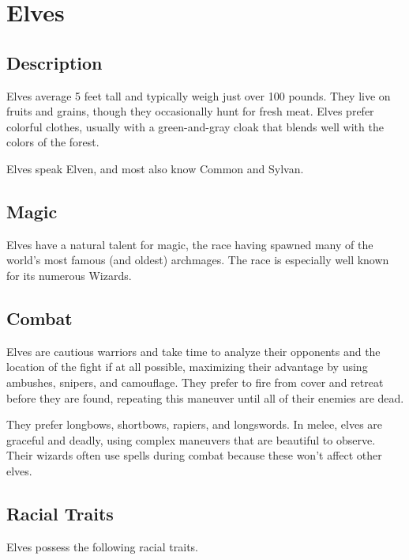 \section{Elves}
\subsection{Description}
Elves average 5 feet tall and typically weigh just over 100 pounds. They live on fruits and grains, though they occasionally hunt for fresh meat. Elves prefer colorful clothes, usually with a green-and-gray cloak that blends well with the colors of the forest.

Elves speak Elven, and most also know Common and Sylvan.
\subsection{Magic}
Elves have a natural talent for magic, the race having spawned many of the world's most famous (and oldest) archmages. The race is especially well known for its numerous Wizards.
\subsection{Combat}
Elves are cautious warriors and take time to analyze their opponents and the location of the fight if at all possible, maximizing their advantage by using ambushes, snipers, and camouflage. They prefer to fire from cover and retreat before they are found, repeating this maneuver until all of their enemies are dead.

They prefer longbows, shortbows, rapiers, and longswords. In melee, elves are graceful and deadly, using complex maneuvers that are beautiful to observe. Their wizards often use  spells during combat because these won't affect other elves.
\subsection{Racial Traits}
Elves possess the following racial traits.

